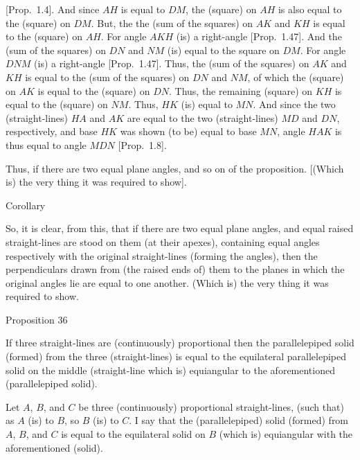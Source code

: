 [Prop.~1.4]. 
And since $AH$ is equal to $DM$, the (square) on $AH$ is also equal
to the (square) on $DM$. But, the the (sum of the squares) on $AK$ and $KH$ is equal to the (square) on $AH$. For angle $AKH$
(is) a right-angle [Prop.~1.47]. And the (sum of the 
squares) on $DN$ and
$NM$ (is) equal to the square
on $DM$. For angle $DNM$ (is) a right-angle [Prop.~1.47]. Thus, the (sum of the squares) on $AK$ and
$KH$ is equal to the (sum of the squares) on $DN$ and $NM$, of
which the (square) on $AK$ is equal to the (square) on $DN$. Thus, the
remaining (square) on $KH$ is equal to the (square) on $NM$. Thus,
$HK$ (is) equal to $MN$. And since the two (straight-lines) $HA$ and
$AK$ are equal to the two (straight-lines) $MD$ and $DN$, respectively,
and base $HK$ was shown (to be) equal to base $MN$,  angle
$HAK$ is thus equal to angle $MDN$ [Prop.~1.8].

Thus, if there are two equal plane angles, and so on of the proposition. [(Which is) the very thing it was required to show].


\begin{center}
{\large Corollary}
\end{center}

So,  it is clear, from this, that if there are two equal plane angles,
and equal raised straight-lines are stood on them (at their apexes), containing equal
angles respectively with the original straight-lines (forming the angles), then the perpendiculars
drawn from (the raised ends of) them to the planes in which the original angles lie are equal
to one another. (Which is) the very thing it was required to show.


\begin{center}
{\large Proposition 36}
\end{center}

If three straight-lines are (continuously)
proportional then the parallelepiped solid (formed) from the three (straight-lines) is equal
to the equilateral parallelepiped solid on the middle (straight-line which is)
equiangular to the aforementioned (parallelepiped solid).

\epsfysize=1.8in
\centerline{}

Let $A$, $B$, and $C$ be three (continuously) proportional straight-lines,
(such that) as $A$ (is) to $B$, so $B$ (is) to $C$. I say that
the (parallelepiped) solid (formed) from $A$, $B$, and $C$ is
equal to the equilateral solid on $B$ (which is) equiangular with the
aforementioned (solid).

